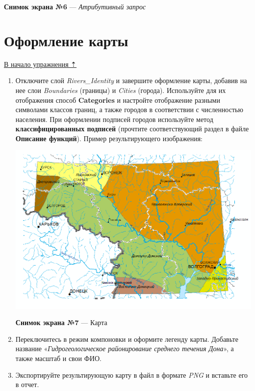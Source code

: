 \documentclass[]{book}
\theoremstyle{definition}
\theoremstyle{definition}
\theoremstyle{definition}
\theoremstyle{remark}
\begin{document}
\textbf{Снимок экрана №6} --- \emph{Атрибутивный запрос}

\hypertarget{map-ref-hydrogeologic-design}{%
\section{Оформление карты}\label{map-ref-hydrogeologic-design}}

\protect\hyperlink{map-ref-hydrogeologic}{В начало упражнения ⇡}

\begin{enumerate}
\def\labelenumi{\arabic{enumi}.}
\item
  Отключите слой \emph{Rivers\_Identity} и завершите оформление карты,
  добавив на нее слои \emph{Boundaries} (границы) и \emph{Cities}
  (города). Используйте для их отображения способ \textbf{Categories} и
  настройте отображение разными символами классов границ, а также
  городов в соответствии с численностью населения. При оформлении
  подписей городов используйте метод \textbf{классифицированных
  подписей} (прочтите соответствующий раздел в файле \textbf{Описание
  функций}). Пример результирующего изображения:

  \includegraphics{images/Ex06/image24.png}

  \textbf{Снимок экрана №7} --- Карта
\item
  Переключитесь в режим компоновки и оформите легенду карты. Добавьте
  название «\emph{Гидрогеологическое районирование среднего течения
  Дона}», а также масштаб и свои ФИО.
\item
  Экспортируйте результирующую карту в файл в формате \emph{PNG} и
  вставьте его в отчет.
\end{enumerate}
\end{document}
